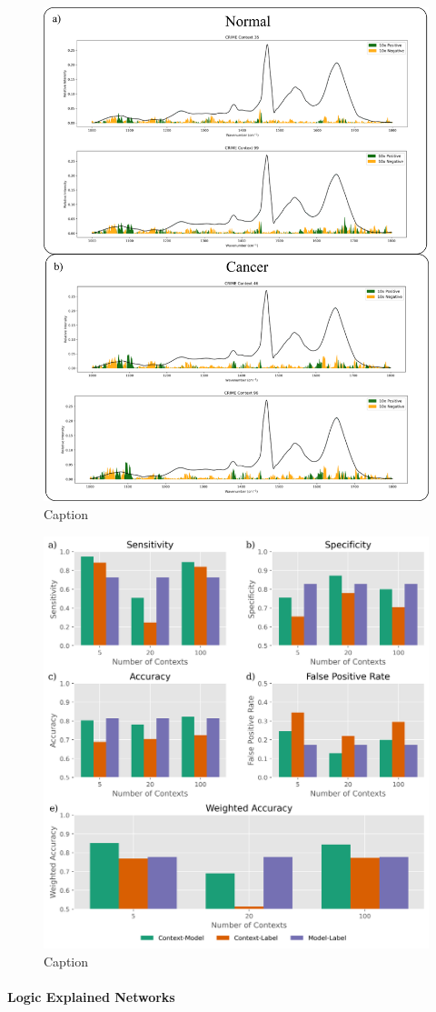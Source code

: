 \begin{figure}[htbp] 
    \centering 
    \includegraphics[width=1\textwidth]{Images/crime_lime_plots.png} 
    \caption{Caption}
\label{fig:my-label} \end{figure}

\begin{figure}[htbp]
    \centering
    \includegraphics[width=1\textwidth]{Images/context_model_metrics.png}
    \caption{Caption} \label{fig:my-label} 
\end{figure}

\paragraph{Logic Explained Networks}